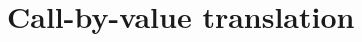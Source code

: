 \documentclass{llncs}
\makeatletter
\theoremstyle{definition}
\theoremstyle{plain}
\newcommand{\ie}{\textit{i.e.}}
\newcommand{\ih}{\textit{i.h.}}
\newcommand\smallbin[1]{\mathchoice
      {\mathbin{\raise.2ex \hbox{$\scriptstyle      #1$}}}%
      {\mathbin{\raise.2ex \hbox{$\scriptstyle      #1$}}}%
      {\mathbin{\raise.12ex\hbox{$\scriptscriptstyle#1$}}}%
      {\mathbin{           \hbox{$\scriptscriptstyle#1$}}}}%
\newcommand\Con{\wedge}
\newcommand\Imp{\rightarrow}
\newcommand\con{\kern1pt{\smallbin\Con}\kern1pt}
\newcommand\imp{\kern1pt{\smallbin\Imp}}
\newcommand\fl[1]{\mathsf{fl}(\trm{#1})}
\newcommand\black{\color{black}}
\newcommand\type@next[1]{%
  \ifx#1,\let\type@loop\type@end\else%
  \ifx#1_\let\type@loop\type@sub\else%
  \ifx#1^\let\type@loop\type@sup\else%
  \ifx#1*\con\else%
  \ifx#1-\kern1pt{\imp}\else%
  #1%
  \fi\fi\fi\fi\fi%
  \type@loop%
}
\newcommand\type@sup@color{}
\newcommand\type@sub[1]{_{#1}\let\type@loop\type@next\type@loop}
\newcommand\type@sup[1]{^{{\type@sup@color #1}}\let\type@loop\type@next\type@loop}
\newcommand\type@end{\let\type@sup@color\relax}
\newcommand\x{\lambda x}
\newcommand\y{\lambda y}
\newcommand\z{\lambda z}
\newcommand\+[1][{}]{\kern1pt{\smallbin\oplus}_{#1}\kern1pt}
\newcommand\lab{\bullet}
\newcommand\trm[1]{%
  \vphantom(%
  \let\term@loop=\term@next%
  \term@loop#1,%
}
\newcommand\term@next[1]{%
  \ifx#1,\let\term@loop\term@end\else%
  \ifx#1:\black\colon\term@typecolor\let\term@loop\term@type\else%
  \ifx#1_\let\term@loop\term@sub\else%
  \ifx#1^\let\term@loop\term@sup\else%
  \ifx#1!\let\term@loop\term@box\else%
  \ifx#1+\let\term@loop\term@prob\else%
  \ifx#1*^\lab\else%
  \ifx#1<\lfloor\else%
  \ifx#1>\rfloor\else%
  \ifx#1..\,\else%
  \ifx#1=\kern1pt{\smallbin=}\kern1pt\else
  #1%
  \fi\fi\fi\fi\fi\fi\fi\fi\fi\fi\fi%
  \term@loop%
}
\newcommand\term@typecolor{}
\newcommand\term@end{\let\term@typecolor\relax}
\newcommand\term@sub[1]{_{#1}\let\term@loop\term@next\term@loop}
\newcommand\term@sup[1]{^{#1}\let\term@loop\term@next\term@loop}
\newcommand\term@prob[1]{\kern1pt\raisebox{-.5pt}{$\overset{\raisebox{-1pt}{$\scriptstyle#1$}}{{\smallbin\oplus}}$}\kern1pt\let\term@loop\term@next\term@loop}
\newcommand\term@type{\let\type@loop=\type@next\type@loop}
\newcommand\term@box[1]{\probox{#1}\let\term@loop\term@next\term@loop}
\newcommand\probox[1]{\begin{tikzpicture}[baseline=0]\node[anchor=base](a){$\scriptstyle #1\vphantom)$};\draw[line width=.6pt] (-5pt,-2.5pt) rectangle (5pt,7.5pt);\end{tikzpicture}}
\newcommand\rw[1][{}]{\stackrel{#1}\rightsquigarrow}
\newcommand\perm{\mathsf p}
\newcommand\proj[3]{\pi^{#1}_{#2}(\trm{#3})}
\renewcommand\rw{\mathrel{\tikz\draw[rw](0,0)--(10pt,0pt);}}
\newcommand\rws{\mathrel{\tikz\draw[rws](0,0)--(10pt,0pt);}}
\makeatother
\begin{document}
%			
%		
%


\newcommand\val{\mathsf{v}}
\newcommand\plusval{\mathbin{\smallbin\oplus_\val}}

\section{Call-by-value translation}
\label{sec:cbv}
\end{document}
